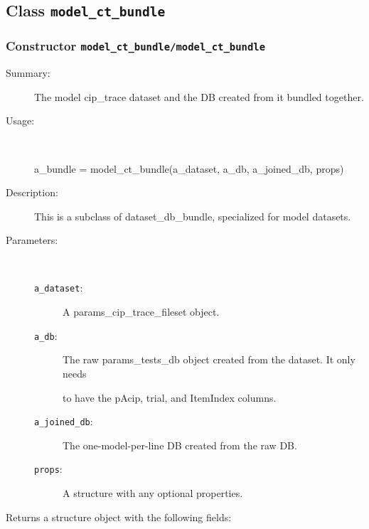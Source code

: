 \subsection{Class \texttt{model\_ct\_bundle}}%
%
\label{ref_model_ct_bundle}%
\hypertarget{ref_model_ct_bundle}{}%
\subsubsection[Constructor \texttt{model\_ct\_bundle}]{Constructor \texttt{model\_ct\_bundle/model\_ct\_bundle}}%
%
\label{ref_model_ct_bundle__model_ct_bundle}%
\hypertarget{ref_model_ct_bundle__model_ct_bundle}{}%
\begin{description}
\item[Summary:]The model cip\_trace dataset and the DB created from it bundled together.
%
\item[Usage:]~%
\begin{lyxcode}%
a\_bundle = model\_ct\_bundle(a\_dataset, a\_db, a\_joined\_db, props)
%
\end{lyxcode}%
%
\item[Description:]%
This is a subclass of dataset\_db\_bundle, specialized for model datasets. 
\item[Parameters:]~
\begin{description}%
\item[\texttt{a\_dataset}:]
 A params\_cip\_trace\_fileset object.
\item[\texttt{a\_db}:]
 The raw params\_tests\_db object created from the dataset. It only needs

to have the pAcip, trial, and ItemIndex columns.
\item[\texttt{a\_joined\_db}:]
 The one-model-per-line DB created from the raw DB.
\item[\texttt{props}:]
 A structure with any optional properties.
\end{description}%
%
\item[Returns a structure object with the following fields:
]~


\end{description}
